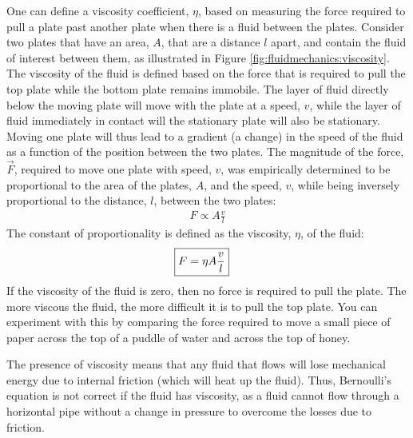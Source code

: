 {{One can define a viscosity coefficient, $\eta$, based on measuring the force required to pull a plate past another plate when there is a fluid between the plates. Consider two plates that have an area, $A$, that are a distance $l$ apart, and contain the fluid of interest between them, as illustrated in Figure \ref{fig:fluidmechanics:viscosity}.
The viscosity of the fluid is defined based on the force that is required to pull the top plate while the bottom plate remains immobile. The layer of fluid directly below the moving plate will move with the plate at a speed, $v$, while the layer of fluid immediately in contact will the stationary plate will also be stationary. Moving one plate will thus lead to a gradient (a change) in the speed of the fluid as a function of the position between the two plates. The magnitude of the force, $\vec F$,  required to move one plate with speed, $v$, was empirically determined to be proportional to the area of the plates, $A$, and the speed, $v$, while being inversely proportional to the distance, $l$, between the two plates:
\begin{align*}
F \propto A\frac{v}{l}
\end{align*}
The constant of proportionality is defined as the viscosity, $\eta$, of the fluid:
\begin{align}
\Aboxed{F = \eta A\frac{v}{l}}
\end{align}
If the viscosity of the fluid is zero, then no force is required to pull the plate. The more viscous the fluid, the more difficult it is to pull the top plate. You can experiment with this by comparing the force required to move a small piece of paper across the top of a puddle of water and across the top of honey.

The presence of viscosity means that any fluid that flows will lose mechanical energy due to internal friction (which will heat up the fluid). Thus, Bernoulli's equation is not correct if the fluid has viscosity, as a fluid cannot flow through a horizontal pipe without a change in pressure to overcome the losses due to friction.

}}
